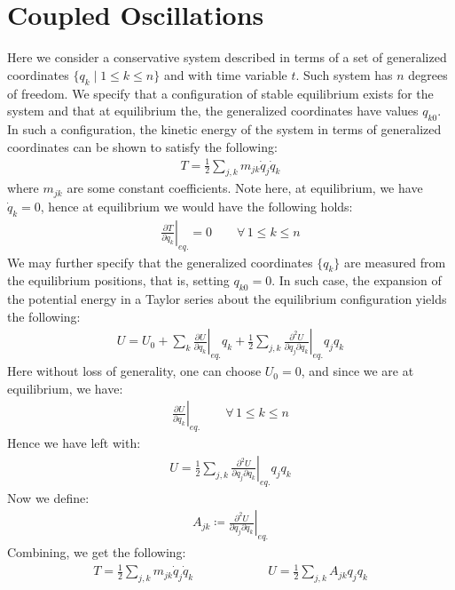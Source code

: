 \documentclass[11pt,oneside]{book}
\theoremstyle{break}
\theoremstyle{break}
\begin{document}
\newpage
\chapter{Coupled Oscillations}
Here we consider a conservative system described in terms of a set of generalized coordinates $\{q_k\mid 1 \leq k \leq n\}$ and with time variable $t$. Such system has $n$ degrees of freedom. We specify that a configuration of stable equilibrium exists for the system and that at equilibrium the, the generalized coordinates have values $q_{k0}$. In such a configuration, the kinetic energy of the system in terms of generalized coordinates can be shown to satisfy the following:
\begin{align*}
T = \frac{1}{2} \sum_{j,k}m_{jk}\dot{q}_j \dot{q}_k
\end{align*}
where $m_{jk}$ are some constant coefficients. Note here, at equilibrium, we have $\dot{q}_k = 0$, hence at equilibrium we would have the following holds:
\begin{align*}
\left.\frac{\partial T}{\partial q_k}\right|_{eq.} = 0 \qquad \forall \, 1\leq k \leq n
\end{align*}
We may further specify that the generalized coordinates $\{q_k\}$ are measured from the equilibrium positions, that is, setting $q_{k0 } = 0$. In such case, the expansion of the potential energy in a Taylor series about the equilibrium configuration yields the following:
\begin{align*}
U = U_0 + \sum_k \left. \frac{\partial U}{\partial q_k}\right|_{eq.} q_k + \frac{1}{2}\sum_{j,k}\left. \frac{\partial^2 U}{\partial q_j \partial q_k}\right|_{eq.} q_j q_k
\end{align*}
Here without loss of generality, one can choose $U_0 = 0$, and since we are at equilibrium, we have:
\begin{align*}
\left. \frac{\partial U}{\partial q_k}\right|_{eq.} \qquad \forall \, 1\leq k \leq n
\end{align*}
Hence we have left with:
\begin{align*}
U = \frac{1}{2}\sum_{j,k}\left. \frac{\partial^2 U}{\partial q_j \partial q_k}\right|_{eq.} q_j q_k
\end{align*}
Now we define:
\begin{align*}
A_{jk} \coloneqq \left.\frac{\partial^2 U}{\partial q_j \partial q_k}\right|_{eq.}
\end{align*}
Combining, we get the following:
\begin{align*}
T = \frac{1}{2}\sum_{j,k}m_{jk}\dot{q}_{j}\dot{q}_k \qquad\qquad\qquad U=\frac{1}{2}\sum_{j,k}A_{jk}q_jq_k
\end{align*}
\end{document}

